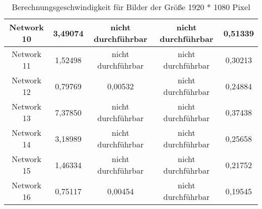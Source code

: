\begin{table}[H]
\begin{tabular}{ |c|c|c|c|c| }
        Network 10 & 3,49074                                & \textcolor{danger}{nicht durchführbar} & \textcolor{danger}{nicht durchführbar} & 0,51339                                \\ \hline
        Network 11 & 1,52498                                & \textcolor{danger}{nicht durchführbar} & \textcolor{danger}{nicht durchführbar} & 0,30213                                \\ \hline
        Network 12 & 0,79769                                & 0,00532                                & \textcolor{danger}{nicht durchführbar} & 0,24884                                \\ \hline
        Network 13 & 7,37850                                & \textcolor{danger}{nicht durchführbar} & \textcolor{danger}{nicht durchführbar} & 0,37438                                \\ \hline
        Network 14 & 3,18989                                & \textcolor{danger}{nicht durchführbar} & \textcolor{danger}{nicht durchführbar} & 0,25658                                \\ \hline
        Network 15 & 1,46334                                & \textcolor{danger}{nicht durchführbar} & \textcolor{danger}{nicht durchführbar} & 0,21752                                \\ \hline
        Network 16 & 0,75117                                & 0,00454                                & \textcolor{danger}{nicht durchführbar} & 0,19545                                \\ \hline
    \end{tabular}
    \caption{Berechnungsgeschwindigkeit für Bilder der Größe 1920 * 1080 Pixel}
    \label{tab:1920x1080}
\end{table}

